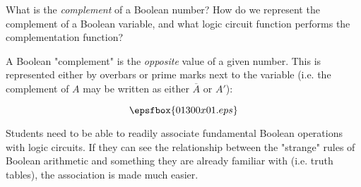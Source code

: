 

What is the {\it complement} of a Boolean number?  How do we represent the complement of a Boolean variable, and what logic circuit function performs the complementation function?







A Boolean "complement" is the {\it opposite} value of a given number.  This is represented either by overbars or prime marks next to the variable (i.e. the complement of $A$ may be written as either $\overline{A}$ or $A'$):

$$\epsfbox{01300x01.eps}$$







Students need to be able to readily associate fundamental Boolean operations with logic circuits.  If they can see the relationship between the "strange" rules of Boolean arithmetic and something they are already familiar with (i.e. truth tables), the association is made much easier.




